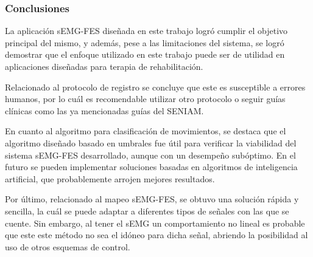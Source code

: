 \subsubsection*{Conclusiones}
La aplicación sEMG-FES diseñada en este trabajo logró cumplir el objetivo principal del mismo, y además, pese a las limitaciones del sistema, se logró demostrar que el enfoque utilizado en este trabajo puede ser de utilidad en aplicaciones diseñadas para terapia de rehabilitación.

Relacionado al protocolo de registro se concluye que este es susceptible a errores humanos, por lo cuál es recomendable utilizar otro protocolo o seguir guías clínicas como las ya mencionadas guías del SENIAM.

En cuanto al algoritmo para clasificación de movimientos, se destaca que el algoritmo diseñado basado en umbrales fue útil para verificar la viabilidad del sistema sEMG-FES desarrollado, aunque con un desempeño subóptimo. En el futuro se pueden implementar soluciones basadas en algoritmos de inteligencia artificial, que probablemente arrojen mejores resultados.

Por último, relacionado al mapeo sEMG-FES, se obtuvo una solución rápida y sencilla, la cuál se puede adaptar a diferentes tipos de señales con las que se cuente. Sin embargo, al tener el sEMG un comportamiento no lineal es probable que este este método no sea el idóneo para dicha señal, abriendo la posibilidad al uso de otros esquemas de control.



